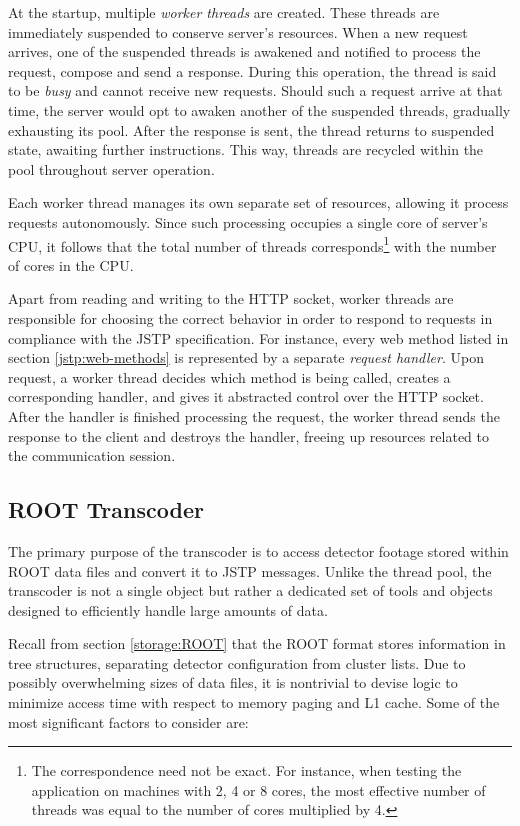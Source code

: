 At the startup, multiple \textit{worker threads} are created. These threads are immediately suspended to conserve server's resources. When a new request arrives, one of the suspended threads is awakened and notified to process the request, compose and send a response. During this operation, the thread is said to be \textit{busy} and cannot receive new requests. Should such a request arrive at that time, the server would opt to awaken another of the suspended threads, gradually exhausting its pool. After the response is sent, the thread returns to suspended state, awaiting further instructions. This way, threads are recycled within the pool throughout server operation.

Each worker thread manages its own separate set of resources, allowing it process requests autonomously. Since such processing occupies a single core of server's CPU, it follows that the total number of threads corresponds\footnote{The correspondence need not be exact. For instance, when testing the application on machines with 2, 4 or 8 cores, the most effective number of threads was equal to the number of cores multiplied by 4.} with the number of cores in the CPU.

Apart from reading and writing to the HTTP socket, worker threads are responsible for choosing the correct behavior in order to respond to requests in compliance with the JSTP specification. For instance, every web method listed in section \ref{jstp:web-methods} is represented by a separate \textit{request handler}. Upon request, a worker thread decides which method is being called, creates a corresponding handler, and gives it abstracted control over the HTTP socket. After the handler is finished processing the request, the worker thread sends the response to the client and destroys the handler, freeing up resources related to the communication session.

\subsection{ROOT Transcoder}
The primary purpose of the transcoder is to access detector footage stored within ROOT data files and convert it to JSTP messages. Unlike the thread pool, the transcoder is not a single object but rather a dedicated set of tools and objects designed to efficiently handle large amounts of data.

Recall from section \ref{storage:ROOT} that the ROOT format stores information in tree structures, separating detector configuration from cluster lists. Due to possibly overwhelming sizes of data files, it is nontrivial to devise logic to minimize access time with respect to memory paging and L1 cache. Some of the most significant factors to consider are:

